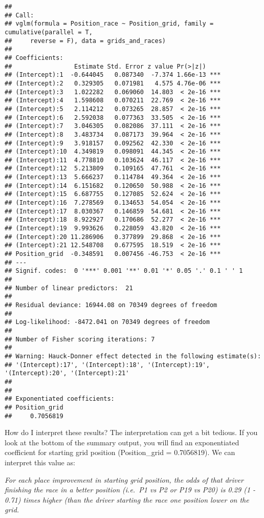 \documentclass[
]{book}
\begin{document}
\begin{verbatim}
## 
## Call:
## vglm(formula = Position_race ~ Position_grid, family = cumulative(parallel = T, 
##     reverse = F), data = grids_and_races)
## 
## Coefficients: 
##                 Estimate Std. Error z value Pr(>|z|)    
## (Intercept):1  -0.644045   0.087340  -7.374 1.66e-13 ***
## (Intercept):2   0.329305   0.071981   4.575 4.76e-06 ***
## (Intercept):3   1.022282   0.069060  14.803  < 2e-16 ***
## (Intercept):4   1.598608   0.070211  22.769  < 2e-16 ***
## (Intercept):5   2.114212   0.073265  28.857  < 2e-16 ***
## (Intercept):6   2.592038   0.077363  33.505  < 2e-16 ***
## (Intercept):7   3.046305   0.082086  37.111  < 2e-16 ***
## (Intercept):8   3.483734   0.087173  39.964  < 2e-16 ***
## (Intercept):9   3.918157   0.092562  42.330  < 2e-16 ***
## (Intercept):10  4.349819   0.098091  44.345  < 2e-16 ***
## (Intercept):11  4.778810   0.103624  46.117  < 2e-16 ***
## (Intercept):12  5.213809   0.109165  47.761  < 2e-16 ***
## (Intercept):13  5.666237   0.114784  49.364  < 2e-16 ***
## (Intercept):14  6.151682   0.120650  50.988  < 2e-16 ***
## (Intercept):15  6.687755   0.127085  52.624  < 2e-16 ***
## (Intercept):16  7.278569   0.134653  54.054  < 2e-16 ***
## (Intercept):17  8.030367   0.146859  54.681  < 2e-16 ***
## (Intercept):18  8.922927   0.170686  52.277  < 2e-16 ***
## (Intercept):19  9.993626   0.228059  43.820  < 2e-16 ***
## (Intercept):20 11.286906   0.377899  29.868  < 2e-16 ***
## (Intercept):21 12.548708   0.677595  18.519  < 2e-16 ***
## Position_grid  -0.348591   0.007456 -46.753  < 2e-16 ***
## ---
## Signif. codes:  0 '***' 0.001 '**' 0.01 '*' 0.05 '.' 0.1 ' ' 1
## 
## Number of linear predictors:  21 
## 
## Residual deviance: 16944.08 on 70349 degrees of freedom
## 
## Log-likelihood: -8472.041 on 70349 degrees of freedom
## 
## Number of Fisher scoring iterations: 7 
## 
## Warning: Hauck-Donner effect detected in the following estimate(s):
## '(Intercept):17', '(Intercept):18', '(Intercept):19', '(Intercept):20', '(Intercept):21'
## 
## 
## Exponentiated coefficients:
## Position_grid 
##     0.7056819
\end{verbatim}

How do I interpret these results? The interpretation can get a bit tedious. If you look at the bottom of the summary output, you will find an exponentiated coefficient for starting grid position (Position\_grid = 0.7056819). We can interpret this value as:

\emph{For each place improvement in starting grid position, the odds of that driver finishing the race in a better position (i.e.~P1 vs P2 or P19 vs P20) is 0.29 (1 - 0.71) times higher (than the driver starting the race one position lower on the grid.}
\end{document}
